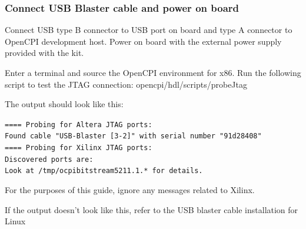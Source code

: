 \documentclass{article}
\newcommand{\terminaloutput}[1]{\texttt{#1}}
\begin{document}
\subsubsection*{Connect USB Blaster cable and power on board}
Connect USB type B connector to USB port on board and type A connector to OpenCPI development host. Power on board with the external power supply provided with the kit.\par\smallskip
\noindent Enter a terminal and source the OpenCPI environment for x86. Run the following script to test the JTAG connection: opencpi/hdl/scripts/probeJtag\par\smallskip
\noindent The output should look like this:\par\smallskip
\noindent\terminaloutput{==== Probing for Altera JTAG ports:\\Found cable "USB-Blaster [3-2]" with serial number "91d28408"\\==== Probing for Xilinx JTAG ports:\\Discovered ports are:\\Look at /tmp/ocpibitstream5211.1.* for details.}\par\bigskip
\noindent For the purposes of this guide, ignore any messages related to Xilinx.\par\medskip
\noindent If the output doesn't look like this, refer to the USB blaster cable installation for Linux
\end{document}

